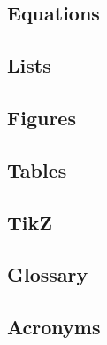     \subsection{Equations}
    \label{sec:tutorial/templates/math}
    
    
    \newpage
    \subsection{Lists}
    \label{sec:tutorial/templates/list}
    

    \subsection{Figures}
    \label{sec:tutorial/templates/fig}
    
    
    \subsection{Tables}
    \label{sec:tutorial/templates/table}
    
        
    \subsection{TikZ}
    \label{sec:tutorial/templates/tikz}
    
    
    \newpage
    \subsection{}
    \label{sec:tutorial/templates/bib}
    
    
    \newpage
    \subsection{Glossary}
    \label{sec:tutorial/templates/glossary}
    
    
    \subsection{Acronyms}
    \label{sec:tutorial/templates/acronym}
    
    

